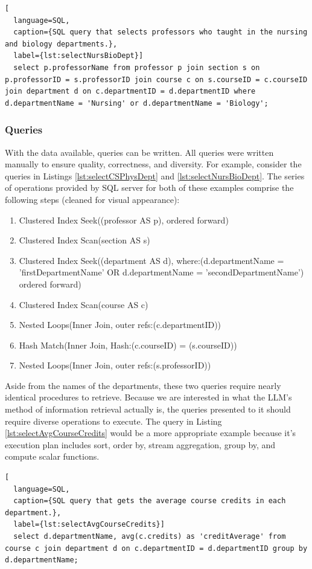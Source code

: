 \begin{lstlisting}[
  language=SQL,
  caption={SQL query that selects professors who taught in the nursing and biology departments.},
  label={lst:selectNursBioDept}]
  select p.professorName from professor p join section s on p.professorID = s.professorID join course c on s.courseID = c.courseID join department d on c.departmentID = d.departmentID where d.departmentName = 'Nursing' or d.departmentName = 'Biology';
\end{lstlisting}

\subsubsection{Queries}
With the data available, queries can be written. All queries were written manually to ensure quality, correctness, and diversity. For example, consider the queries in Listings \ref{lst:selectCSPhysDept} and \ref{lst:selectNursBioDept}. The series of operations provided by SQL server for both of these examples comprise the following steps (cleaned for visual appearance):
\begin{enumerate}
  \raggedright
  \item Clustered Index Seek((professor AS p), ordered forward)
  \item Clustered Index Scan(section AS s)
  \item Clustered Index Seek((department AS d),  where:(d.departmentName = 'firstDepartmentName' OR d.departmentName = 'secondDepartmentName') ordered forward)
  \item Clustered Index Scan(course AS c)
  \item Nested Loops(Inner Join, outer refs:(c.departmentID))
  \item Hash Match(Inner Join, Hash:(c.courseID) = (s.courseID))
  \item Nested Loops(Inner Join, outer refs:(s.professorID))
\end{enumerate}
Aside from the names of the departments, these two queries require nearly identical procedures to retrieve. Because we are interested in what the LLM's method of information retrieval actually is, the queries presented to it should require diverse operations to execute. The query in Listing \ref{lst:selectAvgCourseCredits} would be a more appropriate example because it's execution plan includes sort, order by, stream aggregation, group by, and compute scalar functions.

\begin{lstlisting}[
  language=SQL,
  caption={SQL query that gets the average course credits in each department.},
  label={lst:selectAvgCourseCredits}]
  select d.departmentName, avg(c.credits) as 'creditAverage' from course c join department d on c.departmentID = d.departmentID group by d.departmentName;
\end{lstlisting}

